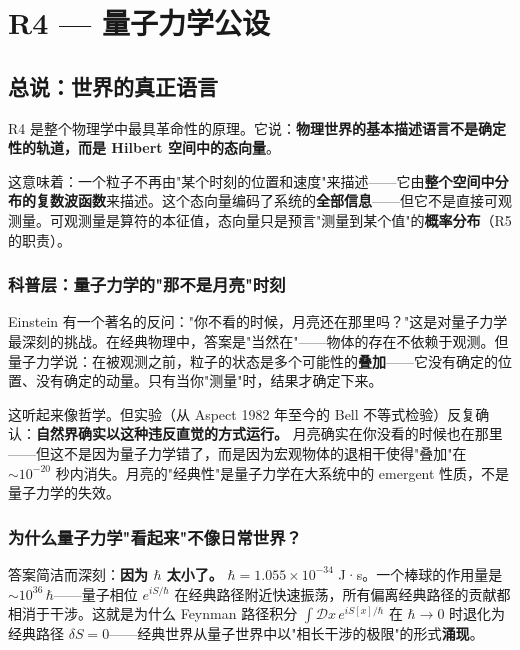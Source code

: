 \chapter{R4 — 量子力学公设}
\label{ch:r4}

\section{总说：世界的真正语言}

R4 是整个物理学中最具革命性的原理。它说：\textbf{物理世界的基本描述语言不是确定性的轨道，而是 Hilbert 空间中的态向量}。

这意味着：一个粒子不再由"某个时刻的位置和速度"来描述——它由\textbf{整个空间中分布的复数波函数}来描述。这个态向量编码了系统的\textbf{全部信息}——但它不是直接可观测量。可观测量是算符的本征值，态向量只是预言"测量到某个值"的\textbf{概率分布}（R5 的职责）。

\subsection{科普层：量子力学的"那不是月亮"时刻}

Einstein 有一个著名的反问："你不看的时候，月亮还在那里吗？"这是对量子力学最深刻的挑战。在经典物理中，答案是"当然在"——物体的存在不依赖于观测。但量子力学说：在被观测之前，粒子的状态是多个可能性的\textbf{叠加}——它没有确定的位置、没有确定的动量。只有当你"测量"时，结果才确定下来。

这听起来像哲学。但实验（从 Aspect 1982 年至今的 Bell 不等式检验）反复确认：\textbf{自然界确实以这种违反直觉的方式运行。} 月亮确实在你没看的时候也在那里——但这不是因为量子力学错了，而是因为宏观物体的退相干使得"叠加"在 $\sim 10^{-20}$ 秒内消失。月亮的"经典性"是量子力学在大系统中的 emergent 性质，不是量子力学的失效。

\subsection{为什么量子力学"看起来"不像日常世界？}

答案简洁而深刻：\textbf{因为 $\hbar$ 太小了。} $\hbar = 1.055 \times 10^{-34}$ J·s。一个棒球的作用量是 $\sim 10^{36}\,\hbar$——量子相位 $e^{iS/\hbar}$ 在经典路径附近快速振荡，所有偏离经典路径的贡献都相消于干涉。这就是为什么 Feynman 路径积分 $\int \mathcal{D}x\, e^{iS[x]/\hbar}$ 在 $\hbar \to 0$ 时退化为经典路径 $\delta S = 0$——经典世界从量子世界中以"相长干涉的极限"的形式\textbf{涌现}。

